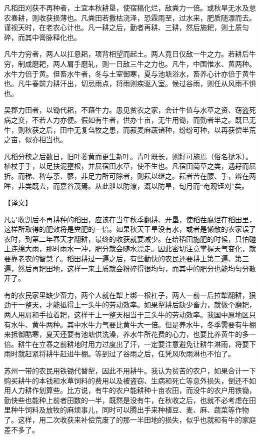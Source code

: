 \documentclass[12pt,UTF8]{ctexbook}
\begin{document}
凡稻田刈获不再种者，土宜本秋耕垦，使宿稿化烂，敌粪力一倍。或秋旱无水及怠农春耕，则收获损薄也。凡粪田若撒枯浇泽，恐霖雨至，过水来，肥质随漂而去。谨视天时，在老农心计也。凡一耕之后，勤者再耕、三耕，然后施耙，则土质匀碎，而其中膏脉释化也。

凡牛力穷者，两人以扛悬耜，项背相望而起土。两人竟日仅敌一牛之力。若耕后牛穷，制成磨耙，两人肩手磨轧，则一日敌三牛之力也。凡牛，中国惟水、黄两种。水牛力倍于黄。但畜水牛者，冬与土室御寒，夏与池塘浴水，畜养心计亦倍于黄牛也。凡牛春前力耕汗出，切忌雨点，将雨则疾驱入室。候过谷雨，则任从风雨不惧也。

吴郡力田者，以锄代耜，不藉牛力。愚见贫农之家，会计牛值与水草之资、窃盗死病之变，不若人力亦便。假如有牛者，供办十亩，无牛用锄，而勤者半之。既已无牛，则秋获之后，田中无复刍牧之患，而菽麦麻蔬诸种，纷纷可种，以再获偿半荒之亩，似亦相当也。

凡稻分秧之后数日，旧叶萎黄而更生新叶。青叶既长，则耔可施焉（俗名挞禾）。植杖于手，以足扶泥壅根，并屈宿田水草，使不生也。凡宿田菵草之类，遇耔而屈折。而稊、稗与荼、蓼，非足力所可除者，则耘以继之。耘者苦在腰、手，辨在两眸，非类既去，而嘉谷茂焉。从此泄以防潦，溉以防旱，旬月而“奄观铚刈”矣。

【译文】

凡是收割后不再耕种的稻田，应该在当年秋季翻耕、开垦，使稻茬腐烂在稻田里，这样所取得的肥效将是粪肥的一倍。如果秋天干旱没有水，或者是懒散的农家误了农时，到第二年春天才翻耕，最终的收获就要减少。在给稻田施肥的时候，只怕碰上连绵大雨，那时雨水一冲，肥分就会随水漂走。因此密切注意掌握天气变化，就要靠老农的智慧了。稻田耕过一遍之后，有些勤快的农民还要耕上第二遍、第三遍，然后再耙田地，这样一来土质就会粉碎得很均匀，而其中的肥分也能均匀分散开了。

有的农民家里缺少畜力，两个人就在犁上绑一根杠子，两人一前一后拉犁翻耕，狠劲干一整天，才能抵得上一头牛的劳动效率。如果犁耕后缺少畜力，就做个磨耙，两人用肩和手拉着耙，这样干上一整天相当于三头牛的劳动效率。我国中原地区只有水牛、黄牛两种。其中水牛力气要比黄牛大一倍。但是养水牛，冬季需要有牛棚来抵御酷寒，夏天还要有池塘供洗澡，养水牛所花费的心力，也要比养黄牛的多一倍。耕牛在立春之前耕地时用力过度出了汗，一定要注意避免让耕牛淋雨，将要下雨时就赶紧将耕牛赶进牛棚。等到过了谷雨之后，任凭风吹雨淋也不怕了。

苏州一带的农民用铁锄代替犁，因此不用耕牛。我认为贫苦的农户，如果合计一下购买耕牛的本钱和水草饲料的费用以及被盗窃、生病和死亡等意外损失，倒还不如用人力耕作划算些。比方说，有牛的农户能耕种十亩农田，而没牛的农户用铁锄，勤快些也能种上前者田数的一半，既然是没有牛，在秋收之后，也就不必考虑在田里种牛饲料及放牧的麻烦事儿，同时可以腾出手来种植豆、麦、麻、蔬菜等作物了。这样，用二次收获来补偿荒废了的那一半田地的损失，似乎也就和有牛的家庭差不多了。
\end{document}
